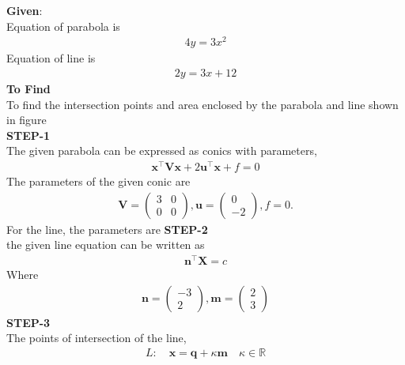 \documentclass[10pt,a4paper]{report}
\newcommand{\myvec}[1]{\ensuremath{\begin{pmatrix}#1\end{pmatrix}}}
\let\vec\mathbf
\let\vec\mathbf
\begin{document}
\begin{multicols}{2}
\raggedright \textbf{Given}:\vspace{2mm}\\
Equation of parabola is \\\vspace{1mm}
\begin{align}
4y=3x^2
\end{align}
Equation of line is \\ \vspace{1mm}
\begin{align}
2y=3x+12
\end{align}
\textbf{To Find }\vspace{2mm}\\
To find the intersection points and area enclosed by the parabola and line shown in figure\vspace{2mm}  \\ 
\textbf{STEP-1}\vspace{2mm}\\
The given parabola can be expressed as conics with parameters,\\ \vspace{1mm}
\begin{align}
	\vec{x}^{\top}\vec{V}\vec{x} + 2\vec{u}^{\top} \vec{x} + f = 0
\end{align}
\fi
The parameters of the given conic are
\begin{align}
\vec{V}=\myvec{
3 & 0\\
0 & 0
},
\vec{u}=\myvec{0\\-2},
f=0.
\end{align} 
For the line, the parameters are
\iffalse
\textbf{STEP-2}\vspace{2mm}\\
the given line equation can be written as\\ 
\begin{align} 
	\vec{n}^{\top}\vec{X}=c
\end{align}
Where
\begin{align}
\vec{n}=\myvec{-3\\2},\vec{m}=\myvec{2\\3}
\end{align}
\textbf{STEP-3}\vspace{2mm}\\
The points of intersection of the line, \\ 
\begin{align}
L: \quad \vec{x} = \vec{q} + \kappa \vec{m} \quad \kappa \in \mathbb{R}

\end{align}
\end{multicols}
\end{document}
